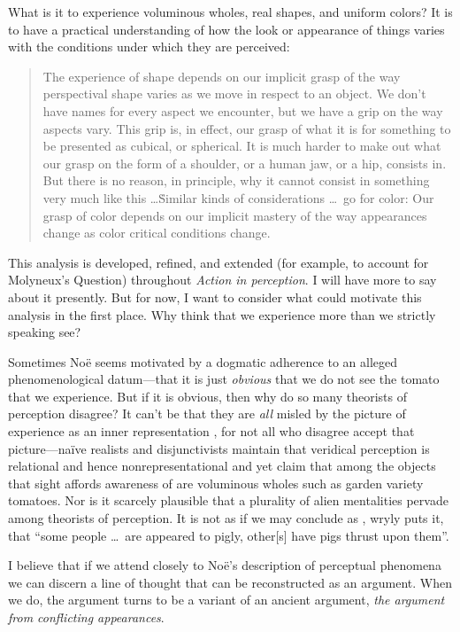 \documentclass[12pt]{article}
\begin{document}
What is it to experience voluminous wholes, real shapes, and uniform colors? It is to have a practical understanding of how the look or appearance of things varies with the conditions under which they are perceived:
\begin{quote}
	The experience of shape depends on our implicit grasp of the way perspectival shape varies as we move in respect to an object. We don’t have names for every aspect we encounter, but we have a grip on the way aspects vary. This grip is, in effect, our grasp of what it is for something to be presented as cubical, or spherical. It is much harder to make out what our grasp on the form of a shoulder, or a human jaw, or a hip, consists in. But there is no reason, in principle, why it cannot consist in something very much like this \ldots\. Similar kinds of considerations \ldots\ go for color: Our grasp of color depends on our implicit mastery of the way appearances change as color critical conditions change. \citep[198--199]{Noe:2004fk}
\end{quote}
This analysis is developed, refined, and extended (for example, to account for Molyneux's Question) throughout \emph{Action in perception}. I will have more to say about it presently. But for now, I want to consider what could motivate this analysis in the first place. Why think that we experience more than we strictly speaking see?

Sometimes Noë seems motivated by a dogmatic adherence to an alleged phenomenological datum---that it is just \emph{obvious} that we do not see the tomato that we experience. But if it is obvious, then why do so many theorists of perception disagree? It can't be that they are \emph{all} misled by the picture of experience as an inner representation \citep[chapter 2]{Noe:2004fk}, for not all who disagree accept that picture---naïve realists and disjunctivists maintain that veridical perception is relational and hence nonrepresentational and yet claim that among the objects that sight affords awareness of are voluminous wholes such as garden variety tomatoes. Nor is it scarcely plausible that a plurality of alien mentalities pervade among theorists of perception. It is not as if we may conclude as \citet[69]{Sartwell:1995ve}, wryly puts it, that ``some people \ldots\ are appeared to pigly, other[s] have pigs thrust upon them''. 

I believe that if we attend closely to Noë's description of perceptual phenomena we can discern a line of thought that can be reconstructed as an argument. When we do, the argument turns to be a variant of an ancient argument, \emph{the argument from conflicting appearances}.


 
 
\end{document}
